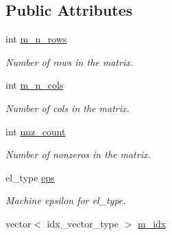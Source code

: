 \subsection*{Public Attributes}
\begin{DoxyCompactItemize}
\item 
int \hyperlink{classlil__sparse__matrix_a6eac075dab519f837ae660c9ef933eb9}{m\+\_\+n\+\_\+rows}\hypertarget{classlil__sparse__matrix_a6eac075dab519f837ae660c9ef933eb9}{}\label{classlil__sparse__matrix_a6eac075dab519f837ae660c9ef933eb9}

\begin{DoxyCompactList}\small\item\em Number of rows in the matrix. \end{DoxyCompactList}\item 
int \hyperlink{classlil__sparse__matrix_aab335a46ece471fd0edf52540e24225a}{m\+\_\+n\+\_\+cols}\hypertarget{classlil__sparse__matrix_aab335a46ece471fd0edf52540e24225a}{}\label{classlil__sparse__matrix_aab335a46ece471fd0edf52540e24225a}

\begin{DoxyCompactList}\small\item\em Number of cols in the matrix. \end{DoxyCompactList}\item 
int \hyperlink{classlil__sparse__matrix_acdc8477f4f3893490bbf0b196438fab8}{nnz\+\_\+count}\hypertarget{classlil__sparse__matrix_acdc8477f4f3893490bbf0b196438fab8}{}\label{classlil__sparse__matrix_acdc8477f4f3893490bbf0b196438fab8}

\begin{DoxyCompactList}\small\item\em Number of nonzeros in the matrix. \end{DoxyCompactList}\item 
el\+\_\+type \hyperlink{classlil__sparse__matrix_af764d0312eb9f7939ab144b12972bf56}{eps}\hypertarget{classlil__sparse__matrix_af764d0312eb9f7939ab144b12972bf56}{}\label{classlil__sparse__matrix_af764d0312eb9f7939ab144b12972bf56}

\begin{DoxyCompactList}\small\item\em Machine epsilon for el\+\_\+type. \end{DoxyCompactList}\item 
vector$<$ idx\+\_\+vector\+\_\+type $>$ \hyperlink{classlil__sparse__matrix_a133b6db4ddc63626a8787abbb2564aa6}{m\+\_\+idx}\hypertarget{classlil__sparse__matrix_a133b6db4ddc63626a8787abbb2564aa6}{}\label{classlil__sparse__matrix_a133b6db4ddc63626a8787abbb2564aa6}


\end{DoxyCompactItemize}
